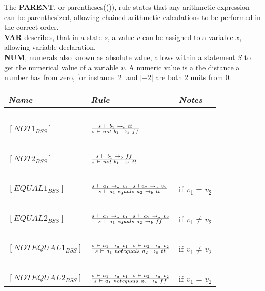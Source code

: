 The \textbf{PARENT}, or parentheses(()), rule states that any arithmetic expression can be parenthesized, allowing chained arithmetic calculations to be performed in the correct order. \\\textbf{VAR} describes, that in a state $s$, a value $v$ can be assigned to a variable $x$, allowing variable declaration.
\\\textbf{NUM}, numerals also known as absolute value, allows within a statement $S$ to get the numerical value of a variable $v$. A numeric value is a the distance a number has from zero, for instance $|2|$ and $|-2|$ are both 2 units from 0.  \\

\begin{table}[H]
	\begin{tabular}{|l|l|l|}
	\hline
	\emph{Name}			& \emph{Rule}																															& \emph{Notes} \\ \hline
			~			&															~																			& ~ \\
	$[NOT1_{BSS}]$		& $s~\vdash~b_{1}~\rightarrow_{b}~tt \over s~\vdash~not~b_{1}~\rightarrow_{b}~ff$														& ~ \\
			~			&															~																			& ~ \\
	$[NOT2_{BSS}]$		& $s~\vdash~b_{1}~\rightarrow_{b}~ff \over s~\vdash~not~b_{1}~\rightarrow_{b}~tt$														& ~ \\
			~			&															~																			& ~ \\
	$[EQUAL1_{BSS}]$	& $s~\vdash~a_{1}~\rightarrow_{a}~v_{1}~~s~\vdash a_{2}~\rightarrow_{a}~v_{2} \over s~\vdash~a_{1}~equals~a_{2}~\rightarrow_{b}~tt$		& if $v_{1} = v_{2}$ \\
			~			&															~																			& ~ \\
	$[EQUAL2_{BSS}]$	& $s~\vdash~a_{1}~\rightarrow_{a}~v_{1}~~s~\vdash~a_{2}~
	\rightarrow_{a}~v_{2} \over s~\vdash~a_{1}~equals~a_{2}~\rightarrow_{b}~ff$		& if $v_{1} \ne v_{2}$ \\
			~			&															~																			& ~ \\
	$[NOTEQUAL1_{BSS}]$	& $s~\vdash~a_{1}~\rightarrow_{a}~v_{1}~~s~\vdash~a_{2}~
	\rightarrow_{a}~v_{2} \over s~\vdash~a_{1}~notequals~a_{2}~\rightarrow_{b}~tt$	& if $v_{1}\ne v_{2}$ \\
			~			&															~																			& ~ \\
	$[NOTEQUAL2_{BSS}]$	& $s~\vdash~a_{1}~\rightarrow_{a}~v_{1}~~s~
	\vdash~a_{2}~\rightarrow_{a}~v_{2} \over s~\vdash~a_{1}~notequals~a_{2}~\rightarrow_{b}~ff$	& if $v_{1} = v_{2}$ \\

\end{tabular}
\end{table}
